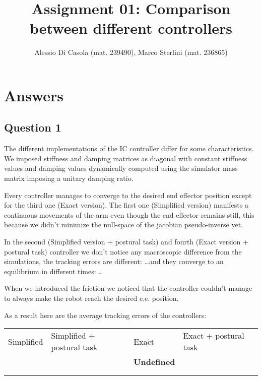 \documentclass[12pt]{article}
\begin{document}
\date{}
\author{Alessio Di Casola (mat. 239490), Marco Sterlini (mat. 236865)}

\title{Assignment 01: Comparison between different controllers}

\maketitle

\section{Answers}
\subsection{Question 1}
The different implementations of the IC controller differ for some characteristics.
We imposed stiffness and damping matrices as diagonal with constant stiffness values and damping values dynamically computed using the simulator mass matrix imposing a unitary damping ratio. 

Every controller manages to converge to the desired end effector position except for the third one (Exact version). The first one (Simplified version) manifests a continuous movements of the arm even though the end effector remains still, this because we didn't minimize the null-space of the jacobian pseudo-inverse yet.

In the second (Simplified version + postural task) and fourth (Exact version + postural task) controller we don't notice any macroscopic difference from the simulations, the tracking errors are different: \dots and they converge to an equilibrium in different times: \dots

When we introduced the friction we noticed that the controller couldn't manage to always make the robot reach the desired e.e. position.

As a result here are the average tracking errors of the controllers:

\begin{table}[h]
    \begin{tabular}{lllll}
    \cline{1-4}
    \multicolumn{1}{|l|}{Simplified} & \multicolumn{1}{l|}{Simplified + postural task} & \multicolumn{1}{l|}{Exact} & \multicolumn{1}{l|}{Exact + postural task} &  \\ \cline{1-4}
    \multicolumn{1}{|l|}{} & \multicolumn{1}{l|}{} & \multicolumn{1}{l|}{\textbf{Undefined}} & \multicolumn{1}{l|}{} &  \\ \cline{1-4}
                           &                       &                       &                       &  \\
                           &                       &                       &                       & 
    \end{tabular}
\end{table}
\end{document}
